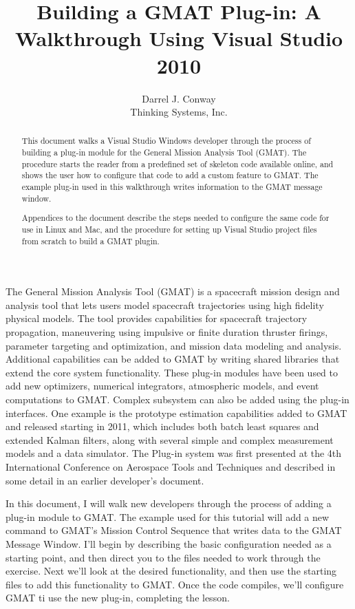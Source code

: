 \documentclass[10pt,letterpaper]{article}
\author{Darrel J. Conway\\Thinking Systems, Inc.}
\title{Building a GMAT Plug-in: A Walkthrough Using Visual Studio 2010}
\begin{document}
\maketitle
\begin{abstract}
This document walks a Visual Studio Windows developer through the process of building a plug-in module for the General Mission Analysis Tool (GMAT).  The procedure starts the reader from a predefined set of skeleton code available online, and shows the user how to configure that code to add a custom feature to GMAT.  The example plug-in used in this walkthrough writes information to the GMAT message window.

Appendices to the document describe the steps needed to configure the same code for use in Linux and Mac, and the procedure for setting up Visual Studio project files from scratch to build a GMAT plugin.  
\end{abstract}

The General Mission Analysis Tool (GMAT) is a spacecraft mission design and analysis tool that lets users model spacecraft trajectories using high fidelity physical models.  The tool provides capabilities for spacecraft trajectory propagation, maneuvering using impulsive or finite duration thruster firings, parameter targeting and optimization, and mission data modeling and analysis.  Additional capabilities can be added to GMAT by writing shared libraries that extend the core system functionality.  These plug-in modules have been used to add new optimizers, numerical integrators, atmospheric models, and event computations to GMAT.  Complex subsystem can also be added using the plug-in interfaces.  One example is the prototype estimation capabilities added to GMAT and released starting in 2011, which includes both batch least squares and extended Kalman filters, along with several simple and complex measurement models and a data simulator.  The Plug-in system was first presented at the 4th International Conference on Aerospace Tools and Techniques\cite{Madrid} and described in some detail in an earlier developer's document\cite{PluginDoc}.

In this document, I will walk new developers through the process of adding a plug-in module to GMAT.  The example used for this tutorial will add a new command to GMAT's Mission Control Sequence that writes data to the GMAT Message Window.  I'll begin by describing the basic configuration needed as a starting point, and then direct you to the files needed to work through the exercise.  Next we'll look at the desired functionality, and then use the starting files to add this functionality to GMAT.  Once the code compiles, we'll configure GMAT ti use the new plug-in, completing the lesson.
\end{document}
